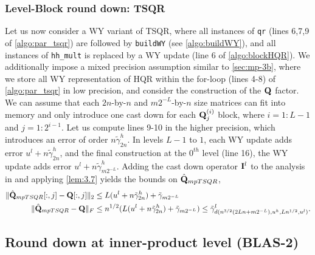 \subsubsection{Level-Block round down: TSQR}\label{sec:mp-3t}
Let us now consider a WY variant of TSQR, where all instances of {\tt qr} (lines 6,7,9 of \cref{algo:par_tsqr}) are followed by {\tt buildWY} (see \cref{algo:buildWY}), and all instances of {\tt hh\_mult} is replaced by a WY update (line 6 of \cref{algo:blockHQR}).
We additionally impose a mixed precision assumption similar to \cref{sec:mp-3b}, where we store all WY representation of HQR within the for-loop (lines 4-8) of \cref{algo:par_tsqr} in low precision, and consider the construction of the $\mathbf{Q}$ factor.
We can assume that each $2n$-by-$n$ and $m2^{-L}$-by-$n$ size matrices can fit into memory and only introduce one cast down for each $\mathbf{Q}_j^{(i)}$ block, where $i=1:L-1$ and $j=1:2^{i-1}$.
Let us compute lines 9-10 in the higher precision, which introduces an error of order $n\tilde{\gamma}_{2n}^h$.
In levels $L-1$ to $1$, each WY update adds error $u^l+n\tilde{\gamma}_{2n}^h$, and the final construction at the $0^{th}$ level (line 16), the WY update adds error $u^l + n\tilde{\gamma}_{m2^{-L}}^h$.
Adding the cast down operator $\mathbf{I}^l$ to the analysis in \cite{Mori2012} and applying \cref{lem:3.7} yields the bounds on $\hat{\mathbf{Q}}_{mpTSQR}$,
\begin{align}
\|\hat{\bb{Q}}_{mpTSQR}[:,j] - \bb{Q}[:,j]\|_2 &\leq L(u^l+n\tilde{\gamma}_{2n}^h)+\tilde{\gamma}_{m2^{-L}}\label{eqn:mpTSQR1}\\%
\|\hat{\bb{Q}}_{mpTSQR} - \bb{Q}\|_F &\leq n^{1/2}(L(u^l+n\tilde{\gamma}_{2n}^h)+\tilde{\gamma}_{m2^{-L}}) \leq \tilde{\gamma}_{d(n^{3/2}(2Ln+m2^{-L}), u^h, Ln^{1/2}, u^l)}^l.\label{eqn:mpTSQR2}
\end{align}

\subsection{Round down at inner-product level (BLAS-2)}\label{sec:mp-2}





























